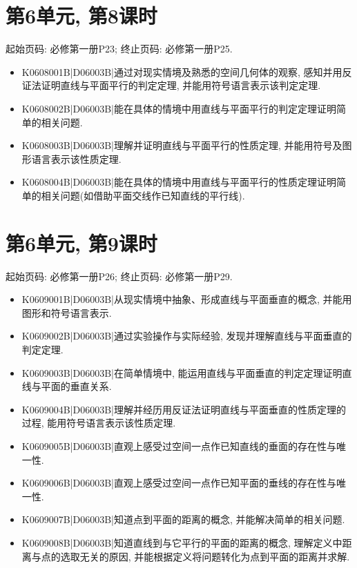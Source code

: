 \section*{第6单元, 第8课时}
起始页码: 必修第一册P23; 终止页码: 必修第一册P25.
\begin{itemize}
\item K0608001B|D06003B|通过对现实情境及熟悉的空间几何体的观察, 感知并用反证法证明直线与平面平行的判定定理, 并能用符号语言表示该判定定理.
\item K0608002B|D06003B|能在具体的情境中用直线与平面平行的判定定理证明简单的相关问题.
\item K0608003B|D06003B|理解并证明直线与平面平行的性质定理, 并能用符号及图形语言表示该性质定理.
\item K0608004B|D06003B|能在具体的情境中用直线与平面平行的性质定理证明简单的相关问题(如借助平面交线作已知直线的平行线).
\end{itemize}

\section*{第6单元, 第9课时}
起始页码: 必修第一册P26; 终止页码: 必修第一册P29.
\begin{itemize}
\item K0609001B|D06003B|从现实情境中抽象、形成直线与平面垂直的概念, 并能用图形和符号语言表示.
\item K0609002B|D06003B|通过实验操作与实际经验, 发现并理解直线与平面垂直的判定定理.
\item K0609003B|D06003B|在简单情境中, 能运用直线与平面垂直的判定定理证明直线与平面的垂直关系.
\item K0609004B|D06003B|理解并经历用反证法证明直线与平面垂直的性质定理的过程, 能用符号语言表示该性质定理.
\item K0609005B|D06003B|直观上感受过空间一点作已知直线的垂面的存在性与唯一性.
\item K0609006B|D06003B|直观上感受过空间一点作已知平面的垂线的存在性与唯一性.
\item K0609007B|D06003B|知道点到平面的距离的概念, 并能解决简单的相关问题.
\item K0609008B|D06003B|知道直线到与它平行的平面的距离的概念, 理解定义中距离与点的选取无关的原因, 并能根据定义将问题转化为点到平面的距离并求解.
\end{itemize}

